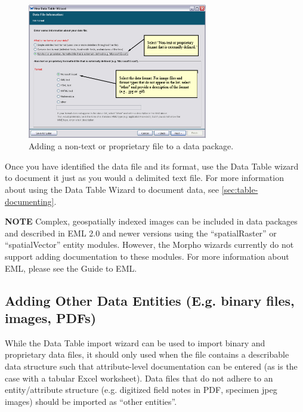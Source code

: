 \begin{figure}
  \centering
    \includegraphics[width=0.7\textwidth]{images/wizard-table-import-nontext.jpg}
  \caption{Adding a non-text or proprietary file to a data package.}
  \label{fig:wizard-table-import-nontext}
\end{figure}

Once you have identified the data file and its format, use the Data
Table wizard to document it just as you would a delimited text file. For
more information about using the Data Table Wizard to document data, see
\autoref{sec:table-documenting}.

\begin{shaded}
  \textbf{NOTE} Complex, geospatially indexed images can be included in
  data packages and described in EML 2.0 and newer versions using the
  ``spatialRaster'' or ``spatialVector'' entity modules. However, the
  Morpho wizards currently do not support adding documentation to these
  modules. For more information about EML, please see the Guide to EML.
\end{shaded}

\subsection[Adding Other Data Entities]{Adding Other Data Entities (E.g. 
binary files, images, PDFs)} \label{sec:importing-other-entities}

While the Data Table import wizard can be used to import binary and proprietary 
data files, it should only used when the file contains a describable data structure 
such that attribute-level documentation can be entered (as is the case with a 
tabular Excel worksheet). Data files that do not adhere to an entity/attribute 
structure (e.g. digitized field notes in PDF, specimen jpeg images) should be 
imported as ``other entities''.

